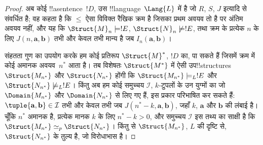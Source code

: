 \documentclass[../../../include/open-logic-section]{subfiles}
\begin{document}
\begin{proof}
अब कोई !!a{sentence}~$!D$, उस !!{language}~$\Lang{L}$ में है जो
$R$, $S$, $J$ इत्यादि से संवर्धित है; वह कहता है कि $\le$ ऐसा विविक्त रैखिक क्रम है जिसका
प्रथम अवयव तो है पर अंतिम अवयव नहीं, और यह कि $\Struct{M}_n \models
!E$,
$\Struct{N}_n \not\models !E$, तथा क्रम के प्रत्येक $n$ के लिए
$J(n, \mathbf{a}, \mathbf{b})$ तभी और केवल तभी मान्य है जब
$I_n(\mathbf{a}, \mathbf{b})$।

संहतता गुण का उपयोग करके हम कोई प्रतिरूप $\Struct{M}^*$, $!D$ का, पा सकते
हैं जिसमें क्रम में कोई अमानक अवयव~$n^*$ आता है। तब विशेषतः
$\Struct{M^*}$ में ऐसी उप!!{structure}s $\Struct{M_{n^*}}$ और
$\Struct{N_{n^*}}$ होंगी कि $\Struct{M_{n^*}}
\models_L !E$ और
$\Struct{N_{n^*}} \not\models_L !E$। किंतु अब हम कोई समुच्चय $\mathcal{I}$,
$k$-टुपलों के उन युग्मों का जो $\Domain{M_{n^*}}$ और
$\Domain{N_{n^*}}$ से लिए गए हैं, इस प्रकार परिभाषित कर सकते हैं: $\tuple{\mathbf{a}, \mathbf{b}} \in \mathcal{I}$ तभी और केवल तभी जब $J(n^*-k, \mathbf{a}, \mathbf{b})$, जहाँ $k$, $\mathbf{a}$ और $\mathbf{b}$ की लंबाई है। चूँकि
$n^*$ अमानक है, प्रत्येक मानक $k$ के लिए $n^* - k >0$, और समुच्चय
$\mathcal{I}$ इस तथ्य का साक्षी है कि $\Struct{M_{n^*}} \simeq_p
\Struct{N_{n^*}}$। किंतु  से
$\Struct{M_{n^*}}$, $L$ की दृष्टि से, $\Struct{N_{n^*}}$ के तुल्य है, जो विरोधाभास है।
\end{proof}
\end{document}

